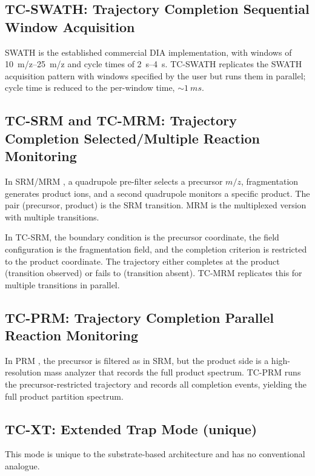 \documentclass[twocolumn,11pt,a4paper]{article}
\theoremstyle{definition}
\theoremstyle{remark}
\begin{document}
\subsection{TC-SWATH: Trajectory Completion Sequential Window Acquisition}

SWATH \citep{gillet2012} is the established commercial DIA implementation, with windows of \SIrange{10}{25}{m/z} and cycle times of \SIrange{2}{4}{s}. TC-SWATH replicates the SWATH acquisition pattern with windows specified by the user but runs them in parallel; cycle time is reduced to the per-window time, $\sim\SI{1}{ms}$.

\subsection{TC-SRM and TC-MRM: Trajectory Completion Selected/Multiple Reaction Monitoring}

In SRM/MRM \citep{lange2008}, a quadrupole pre-filter selects a precursor $m/z$, fragmentation generates product ions, and a second quadrupole monitors a specific product. The pair (precursor, product) is the SRM transition. MRM is the multiplexed version with multiple transitions.

In TC-SRM, the boundary condition is the precursor coordinate, the field configuration is the fragmentation field, and the completion criterion is restricted to the product coordinate. The trajectory either completes at the product (transition observed) or fails to (transition absent). TC-MRM replicates this for multiple transitions in parallel.

\subsection{TC-PRM: Trajectory Completion Parallel Reaction Monitoring}

In PRM \citep{peterson2012}, the precursor is filtered as in SRM, but the product side is a high-resolution mass analyzer that records the full product spectrum. TC-PRM runs the precursor-restricted trajectory and records all completion events, yielding the full product partition spectrum.

\subsection{TC-XT: Extended Trap Mode (unique)}

This mode is unique to the substrate-based architecture and has no conventional analogue.
\end{document}
